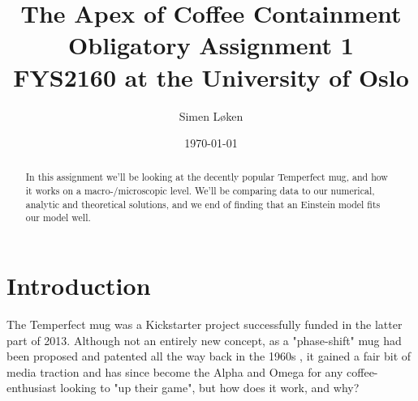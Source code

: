 \documentclass{article}
\begin{document}
\title{%
  The Apex of Coffee Containment \\
  \large Obligatory Assignment 1 \\
  FYS2160 at the University of Oslo}


\author{Simen Løken}


\date{\today}
\maketitle
\begin{abstract}
In this assignment we'll be looking at the decently popular Temperfect mug, and how it works on a macro-/microscopic level. We'll be comparing data to our numerical, analytic and theoretical solutions, and we end of finding that an Einstein model fits our model well.
\end{abstract}





\section{Introduction}
The Temperfect mug was a Kickstarter project successfully funded in the latter part of 2013. Although not an entirely new concept, as a "phase-shift" mug had been proposed and patented all the way back in the 1960s \cite{article}, it gained a fair bit of media traction and has since become the Alpha and Omega for any coffee-enthusiast looking to "up their game", but how does it work, and why?
\end{document}

